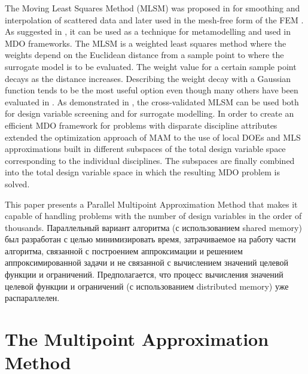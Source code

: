 \documentclass[runningheads,a4paper]{llncs}
\begin{document}
The Moving Least Squares Method (MLSM) was proposed in \cite{LancasterSalkauskas1981} for smoothing and interpolation of scattered data and later used in the mesh-free form of the FEM \cite{Liszka1984}. As suggested in \cite{ChoiYounYang2001}, it can be used as a technique for metamodelling and used in MDO frameworks. The MLSM is a weighted least squares method where the weights depend on the Euclidean distance from a sample point to where the surrogate model is to be evaluated. The weight value for a certain sample point decays as the distance increases. Describing the weight decay with a Gaussian function tends to be the most useful option even though many others have been evaluated in \cite{ToropovSchrammSahaiJones2005}. As demonstrated in \cite{PolynkinToropov2010}, the cross-validated MLSM can be used both for design variable screening and for surrogate modelling. In order to create an efficient MDO framework for problems with disparate discipline attributes \cite{OllarToropovJones2014} extended the optimization approach of MAM to the use of local DOEs and MLS approximations built in different subspaces of the total design variable space corresponding to the individual disciplines. The subspaces are finally combined into the total design variable space in which the resulting MDO problem is solved.

\Russian
This paper presents a Parallel Multipoint Approximation Method that makes it capable of handling problems with the number of design variables in the order of thousands. Параллельный вариант алгоритма (с использованием shared memory) был разработан с целью минимизировать время, затрачиваемое на работу части алгоритма, связанной с построением аппроксимации и решением аппроксимированной задачи и не связанной с вычислением значений целевой функции и ограничений. Предполагается, что процесс вычисления значений целевой функции и ограничений (с использованием distributed memory) уже распараллелен.

\section{The Multipoint Approximation Method}
\label{sec:MAM}
\end{document}
